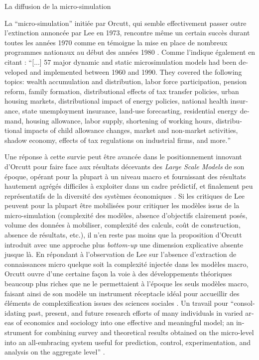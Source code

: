 \begin{testiv}{La diffusion de la micro-simulation}{}

La \enquote{micro-simulation} initiée par Orcutt, qui semble effectivement passer outre l'extinction annoncée par Lee en 1973, rencontre même un certain succès durant toutes les années 1970 comme en témoigne la mise en place de nombreux programmes nationaux au début des années 1980 \autocites{Merz1991, Merz1994, Baroni2007}. Comme l'indique également \textcite{Boman2005} en citant \textcite{Merz1991} : \foreignquote{english}{[...] 57 major dynamic and static microsimulation models had been developed and implemented between 1960 and 1990. They covered the following topics: wealth accumulation and distribution, labor force participation, pension reform, family formation, distributional effects of tax transfer policies, urban housing markets, distributional impact of energy policies, national health insurance, state unemployment insurance, land-use forecasting, residential energy demand, housing allowance, labor supply, shortening of working hours, distributional impacts of child allowance changes, market and non-market activities, shadow economy, effects of tax regulations on industrial firms, and more.}

Une réponse à cette survie peut être avancée dans le positionnement innovant d'Orcutt pour faire face aux résultats décevants des \textit{Large Scale Models} de son époque, opérant pour la plupart à un niveau macro et fournissant des résultats hautement agrégés difficiles à exploiter dans un cadre prédictif, et finalement peu représentatifs de la diversité des systèmes économiques \autocites{Birkin2012, Baroni2007}. Si les critiques de Lee peuvent pour la plupart être mobilisées pour critiquer les modèles issus de la micro-simulation (complexité des modèles, absence d'objectifs clairement posés, volume des données à mobiliser, complexité des calculs, coût de construction, absence de résultats, etc.), il n'en reste pas moins que la proposition d'Orcutt introduit avec une approche plus \textit{bottom-up} une dimension explicative absente jusque là. En répondant à l'observation de Lee sur l'absence d'extraction de connaissances micro quelque soit la complexité injectée dans les modèles macro, Orcutt ouvre d'une certaine façon la voie à des développements théoriques beaucoup plus riches que ne le permettaient à l'époque les seuls modèles macro, faisant ainsi de son modèle un instrument réceptacle idéal pour accueillir des éléments de complexification issues des sciences sociales \autocite[19]{Czajka1993}. Un travail pour \foreignquote{english}{consolidating past, present, and future research efforts of many individuals in varied areas of economics and sociology into one effective and meaningful model; an instrument for combining survey and theoretical results obtained on the micro-level into an all-embracing system useful for prediction, control, experimentation, and analysis on the aggregate level} \autocite[122]{Cohen1961}.


\end{testiv}
